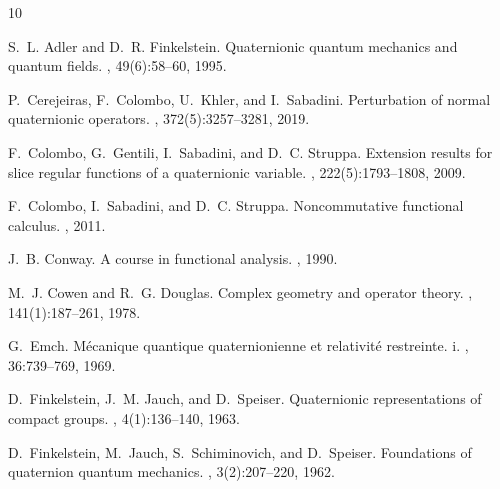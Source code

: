 \documentclass[pdflatex,sn-mathphys-num]{sn-jnl}%
\theoremstyle{thmstyleone}%
\theoremstyle{thmstyletwo}%
\theoremstyle{thmstylethree}%
\theoremstyle{definition}
\theoremstyle{remark}
\begin{document}
\noindent







\begin{thebibliography}{10}

S.~L. Adler and D.~R. Finkelstein.
\newblock Quaternionic quantum mechanics and quantum fields.
, 49(6):58--60, 1995.

P.~Cerejeiras, F.~Colombo, U.~Khler, and I.~Sabadini.
\newblock Perturbation of normal quaternionic operators.
, 372(5):3257--3281, 2019.

F.~Colombo, G.~Gentili, I.~Sabadini, and D.~C. Struppa.
\newblock Extension results for slice regular functions of a quaternionic
  variable.
, 222(5):1793--1808, 2009.

F.~Colombo, I.~Sabadini, and D.~C. Struppa.
\newblock Noncommutative functional calculus.
, 2011.

J.~B. Conway.
\newblock A course in functional analysis.
, 1990.

M.~J. Cowen and R.~G. Douglas.
\newblock Complex geometry and operator theory.
, 141(1):187--261, 1978.

G.~Emch.
\newblock M{\'e}canique quantique quaternionienne et relativit{\'e} restreinte.
  i.
, 36:739--769, 1969.

D.~Finkelstein, J.~M. Jauch, and D.~Speiser.
\newblock Quaternionic representations of compact groups.
, 4(1):136--140, 1963.

D.~Finkelstein, M.~Jauch, S.~Schiminovich, and D.~Speiser.
\newblock Foundations of quaternion quantum mechanics.
, 3(2):207--220, 1962.


\end{thebibliography}
\end{document}
